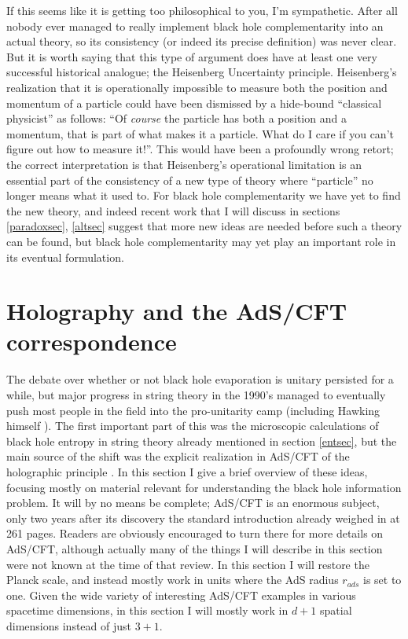 \documentclass[12pt]{article}
\begin{document}
If this seems like it is getting too philosophical to you, I'm sympathetic.  After all nobody ever managed to really implement black hole complementarity into an actual theory, so its consistency (or indeed its precise definition) was never clear.  But it is worth saying that this type of argument does have at least one very successful historical analogue; the Heisenberg Uncertainty principle.  Heisenberg's realization that it is operationally impossible to measure both the position and momentum of a particle could have been dismissed by a hide-bound ``classical physicist'' as follows: ``Of \textit{course} the particle has both a position and a momentum, that is part of what makes it a particle.  What do I care if you can't figure out how to measure it!''.  This would have been a profoundly wrong retort; the correct interpretation is that Heisenberg's operational limitation is an essential part of the consistency of a new type of theory where ``particle'' no longer means what it used to.  For black hole complementarity we have yet to find the new theory, and indeed recent work that I will discuss in sections \ref{paradoxsec}, \ref{altsec} suggest that more new ideas are needed before such a theory can be found, but black hole complementarity may yet play an important role in its eventual formulation.

  
\section{Holography and the AdS/CFT correspondence}\label{adssec}
The debate over whether or not black hole evaporation is unitary persisted for a while, but major progress in string theory in the 1990's managed to eventually push most people in the field into the pro-unitarity camp (including Hawking himself \cite{Hawking:2005kf}).  The first important part of this was the microscopic calculations of black hole entropy in string theory already mentioned in section \ref{entsec}, but the main source of the shift was the explicit realization in AdS/CFT \cite{Maldacena:1997re,Witten:1998qj,Gubser:1998bc} of the holographic principle \cite{tHooft:1993gx,Susskind:1994vu}.  In this section I give a brief overview of these ideas, focusing mostly on material relevant for understanding the black hole information problem.  It will by no means be complete; AdS/CFT is an enormous subject, only two years after its discovery the standard introduction \cite{Aharony:1999ti} already weighed in at 261 pages.  Readers are obviously encouraged to turn there for more details on AdS/CFT, although actually many of the things I will describe in this section were not known at the time of that review.  In this section I will restore the Planck scale, and instead mostly work in units where the AdS radius $r_{\mathit{ads}}$ is set to one.  Given the wide variety of interesting AdS/CFT examples in various spacetime dimensions, in this section I will mostly work in $d+1$ spatial dimensions instead of just $3+1$.
\end{document}
